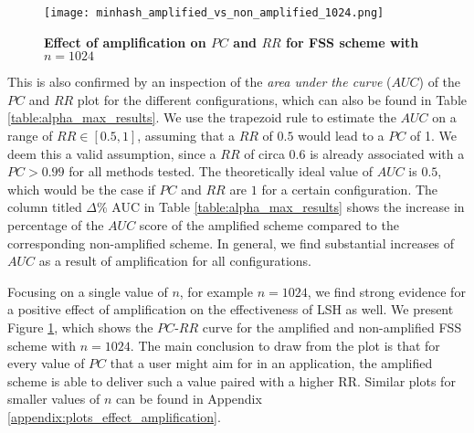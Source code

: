 \begin{figure}[!htb]
    \centering
    \texttt{[image: minhash\_amplified\_vs\_non\_amplified\_1024.png]}
    \caption[Effect of amplification on $PC$ and $RR$ for FSS scheme with $n=1024$]{\textbf{Effect of amplification on $PC$ and $RR$ for FSS scheme with $n=1024$}}
    \label{fig:Effect of amplification - minhash}
\end{figure}
This is also confirmed by an inspection of the \textit{area under the curve} ($AUC$) of the $PC$ and $RR$ plot for the different configurations, which can also be found in Table \ref{table:alpha_max_results}. We use the trapezoid rule to estimate the $AUC$ on a range of $RR\in[0.5,1]$, assuming that a $RR$ of $0.5$ would lead to a $PC$ of 1. We deem this a valid assumption, since a $RR$ of circa $0.6$ is already associated with a $PC>0.99$ for all methods tested. The theoretically ideal value of $AUC$ is $0.5$, which would be the case if $PC$ and $RR$ are $1$ for a certain configuration. %
The column titled $\Delta \%$ AUC in Table \ref{table:alpha_max_results} shows the increase in percentage of the $AUC$ score of the amplified scheme compared to the corresponding non-amplified scheme. In general, we find substantial increases of $AUC$ as a result of amplification for all configurations.

Focusing on a single value of $n$, for example $n=1024$, we find strong evidence for a positive effect of amplification on the effectiveness of LSH as well. We present Figure \ref{fig:Effect of amplification - minhash}, which shows the $PC$-$RR$ curve for the amplified and non-amplified FSS scheme with $n=1024$. The main conclusion to draw from the plot is that for every value of $PC$ that a user might aim for in an application, the amplified scheme is able to deliver such a value paired with a higher RR. Similar plots for smaller values of $n$ can be found in Appendix \ref{appendix:plots_effect_amplification}.

